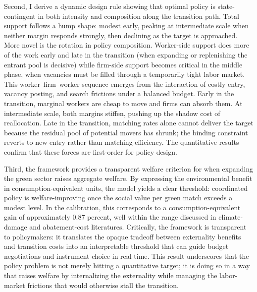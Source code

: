 \documentclass[preprint,12pt]{elsarticle}
\begin{document}
Second, I derive a dynamic design rule showing that optimal policy is state-contingent in both intensity and composition along the transition path. Total support follows a hump shape: modest early, peaking at intermediate scale when neither margin responds strongly, then declining as the target is approached. More novel is the rotation in policy composition. Worker-side support does more of the work early and late in the transition (when expanding or replenishing the entrant pool is decisive) while firm-side support becomes critical in the middle phase, when vacancies must be filled through a temporarily tight labor market. This worker–firm–worker sequence emerges from the interaction of costly entry, vacancy posting, and search frictions under a balanced budget. Early in the transition, marginal workers are cheap to move and firms can absorb them. At intermediate scale, both margins stiffen, pushing up the shadow cost of reallocation. Late in the transition, matching rates alone cannot deliver the target because the residual pool of potential movers has shrunk; the binding constraint reverts to new entry rather than matching efficiency. The quantitative results confirm that these forces are first-order for policy design.

Third, the framework provides a transparent welfare criterion for when expanding the green sector raises aggregate welfare. By expressing the environmental benefit in consumption-equivalent units, the model yields a clear threshold: coordinated policy is welfare-improving once the social value per green match exceeds a modest level. In the calibration, this corresponds to a consumption-equivalent gain of approximately 0.87 percent, well within the range discussed in climate-damage and abatement-cost literatures. Critically, the framework is transparent to policymakers: it translates the opaque tradeoff between externality benefits and transition costs into an interpretable threshold that can guide budget negotiations and instrument choice in real time. This result underscores that the policy problem is not merely hitting a quantitative target; it is doing so in a way that raises welfare by internalizing the externality while managing the labor-market frictions that would otherwise stall the transition.
\end{document}
